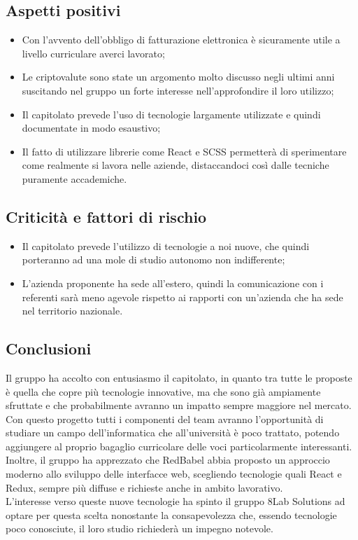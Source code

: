 \subsection{Aspetti positivi}
\begin{itemize}
	\item Con l'avvento dell'obbligo di fatturazione elettronica è sicuramente
	utile a livello curriculare averci lavorato;
	\item Le criptovalute sono state un argomento molto discusso negli ultimi anni 
suscitando nel gruppo un forte interesse nell'approfondire il loro utilizzo;
	\item Il capitolato prevede l'uso di tecnologie largamente utilizzate e quindi 
documentate in modo esaustivo;
	\item Il fatto di utilizzare librerie come React e SCSS permetterà di
	sperimentare come realmente si lavora nelle aziende, distaccandoci così dalle
	tecniche puramente accademiche.
\end{itemize}

\subsection{Criticità e fattori di rischio}
\begin{itemize}
	\item Il capitolato prevede l'utilizzo di tecnologie a noi nuove, che quindi 
porteranno ad una mole di studio autonomo non indifferente;
	\item L'azienda proponente ha sede all'estero, quindi la comunicazione con i 
referenti sarà meno agevole rispetto ai rapporti con un'azienda che ha sede nel 
territorio nazionale.
\end{itemize}

\subsection{Conclusioni} Il gruppo ha accolto con entusiasmo il capitolato, in 
quanto tra tutte le proposte è quella che copre più tecnologie innovative, ma 
che sono già ampiamente sfruttate e che probabilmente avranno un impatto sempre 
maggiore nel mercato. Con questo progetto tutti i componenti del team avranno 
l'opportunità di studiare un 
campo dell'informatica che all'università è poco trattato, potendo aggiungere al 
proprio bagaglio curricolare delle voci particolarmente interessanti. Inoltre, 
il gruppo ha apprezzato che RedBabel abbia proposto un approccio moderno allo 
sviluppo delle interfacce web, scegliendo tecnologie quali React e Redux, sempre 
più diffuse e richieste anche in ambito lavorativo.\\
 L'interesse verso queste nuove tecnologie ha spinto il gruppo 8Lab Solutions ad 
optare per questa scelta nonostante la consapevolezza che, essendo tecnologie 
poco conosciute, il loro studio richiederà un impegno notevole.

